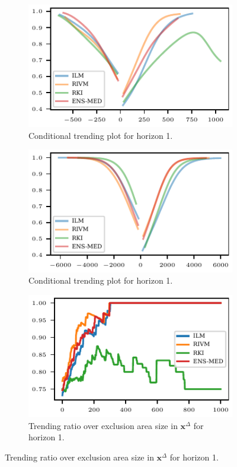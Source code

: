 \documentclass[pdflatex]{sn-jnl}
\theoremstyle{plain}%
\theoremstyle{definition}
\newcommand{\diffx}{\mathbf{x}^{\Delta}}
\begin{document}
\begin{figure}
    \centering
    \begin{subfigure}[t]{.48\textwidth}
    \includegraphics{plots/covid_nowcast/40_cond_prob_lag_1}
    \caption{Conditional trending plot for horizon 1.}\label{fig:app-covid-cond-prob-1}
    \end{subfigure}\hfill
    \begin{subfigure}[t]{.48\textwidth}
    \includegraphics{plots/covid_nowcast/40_cond_prob_lag_14}
    \caption{Conditional trending plot for horizon 1.}\label{fig:app-covid-cond-prob-14}
    \end{subfigure}
    \begin{subfigure}[t]{.48\textwidth}
    \includegraphics{plots/covid_nowcast/40_acc_eps_lag_1}
    \caption{Trending ratio over exclusion area size in $\diffx$ for horizon 1.}\label{fig:app-covid-trending-ratio-1}

\end{subfigure}
\end{figure}
\end{document}
